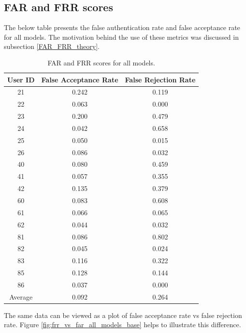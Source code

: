 \subsection{FAR and FRR scores}
The below table presents the false authentication rate and false acceptance rate for all models. The motivation behind the use of these metrics was discussed in subsection \ref{FAR_FRR_theory}.

\begin{center}
\begin{table}[H]
\begin{center}
	\begin{tabular}{ |c|c|c| } 
		\hline
		User ID & False Acceptance Rate & False Rejection Rate \\
		\hline
		21 & 0.242 & 0.119 \\
		\hline
		22 & 0.063 & 0.000 \\
		\hline
		23 & 0.200 & 0.479 \\
		\hline
		24 & 0.042 & 0.658 \\
		\hline
		25 & 0.050 & 0.015 \\
		\hline
		26 & 0.086 & 0.032 \\
		\hline
		40 & 0.080 & 0.459 \\
		\hline
		41 & 0.057 & 0.355 \\
		\hline
		42 & 0.135 & 0.379 \\
		\hline
		60 & 0.083 & 0.608 \\
		\hline
		61 & 0.066 & 0.065 \\
		\hline
		62 & 0.044 & 0.032 \\
		\hline
		81 & 0.086 & 0.802 \\
		\hline
		82 & 0.045 & 0.024 \\
		\hline
		83 & 0.116 & 0.322 \\
		\hline
		85 & 0.128 & 0.144 \\
		\hline
		86 & 0.037 & 0.000 \\
		\hline
		\hline
		Average & 0.092 & 0.264 \\
		\hline
	\end{tabular}
\end{center}
\caption{FAR and FRR scores for all models.}
\label{table:FAR_FRR_base}
\end{table}
\end{center}

The same data can be viewed as a plot of false acceptance rate vs false rejection rate. 
Figure \ref{fig:frr_vs_far_all_models_base} helps to illustrate this difference. 

